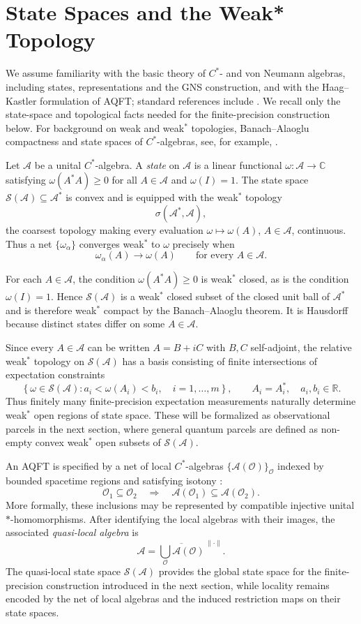 \documentclass[11pt]{article}
\newcommand{\A}{\mathcal{A}}
\begin{document}
\section{State Spaces and the Weak* Topology}
\label{sec:state-space}

We assume familiarity with the basic theory of $C^*$- and von Neumann
algebras, including states, representations and the GNS construction, and
with the Haag--Kastler formulation of AQFT; standard references include
\cite{KadisonRingrose1,KadisonRingrose2,brattelirobinson1,
haag2012local,Araki}. We recall only the state-space and topological facts
needed for the finite-precision construction below. For background on
weak and weak$^*$ topologies, Banach--Alaoglu compactness and state spaces
of $C^*$-algebras, see, for example,
\cite{KadisonRingrose1,brattelirobinson1}.

Let $\A$ be a unital $C^*$-algebra. A \emph{state} on $\A$ is a linear
functional $\omega:\A\to\mathbb C$ satisfying $\omega(A^*A)\geq0$ for all
$A\in\A$ and $\omega(I)=1$. The state space
$\mathcal S(\A)\subseteq\A^*$ is convex and is equipped with the
weak$^*$ topology
\[
\sigma(\A^*,\A),
\]
the coarsest topology making every evaluation
$\omega\mapsto\omega(A)$, $A\in\A$, continuous. Thus a net
$\{\omega_\alpha\}$ converges weak$^*$ to $\omega$ precisely when
\[
\omega_\alpha(A)\longrightarrow\omega(A)
\qquad\text{for every }A\in\A.
\]

For each $A\in\A$, the condition $\omega(A^*A)\geq0$ is weak$^*$
closed, as is the condition $\omega(I)=1$. Hence
$\mathcal S(\A)$ is a weak$^*$ closed subset of the closed unit ball of
$\A^*$ and is therefore weak$^*$ compact by the Banach--Alaoglu theorem.
It is Hausdorff because distinct states differ on some $A\in\A$. 

Since every $A\in\A$ can be written $A=B+iC$ with $B,C$ self-adjoint,
the relative weak$^*$ topology on $\mathcal S(\A)$ has a basis consisting
of finite intersections of expectation constraints
\[
\left\{
\omega\in\mathcal S(\A):
a_i<\omega(A_i)<b_i,\quad i=1,\ldots,m
\right\},
\qquad
A_i=A_i^*,\quad a_i,b_i\in\mathbb R.
\]
Thus finitely many finite-precision expectation measurements naturally
determine weak$^*$ open regions of state space. These will be formalized
as observational parcels in the next section, where general quantum
parcels are defined as non-empty convex weak$^*$ open subsets of
$\mathcal S(\A)$.

An AQFT is specified by a net of local $C^*$-algebras
$\{\A(\mathcal O)\}_{\mathcal O}$ indexed by bounded spacetime regions
and satisfying isotony
\cite{HaagKastler,haag2012local}:
\[
\mathcal O_1\subseteq\mathcal O_2
\quad\Longrightarrow\quad
\A(\mathcal O_1)\subseteq\A(\mathcal O_2).
\]
More formally, these inclusions may be represented by compatible
injective unital $*$-homomorphisms. After identifying the local algebras
with their images, the associated \emph{quasi-local algebra} is
\[
\A
=
\overline{\bigcup_{\mathcal O}\A(\mathcal O)}^{\,\|\cdot\|}.
\]
The quasi-local state space $\mathcal S(\A)$ provides the global state
space for the finite-precision construction introduced in the next
section, while locality remains encoded by the net of local algebras and
the induced restriction maps on their state spaces.
\end{document}
